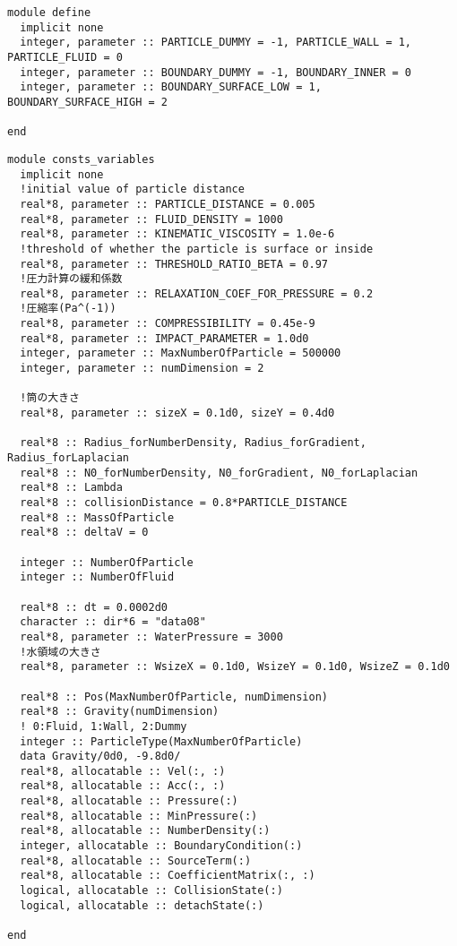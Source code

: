 \begin{lstlisting}[caption=定義値]
module define
  implicit none
  integer, parameter :: PARTICLE_DUMMY = -1, PARTICLE_WALL = 1, PARTICLE_FLUID = 0
  integer, parameter :: BOUNDARY_DUMMY = -1, BOUNDARY_INNER = 0
  integer, parameter :: BOUNDARY_SURFACE_LOW = 1, BOUNDARY_SURFACE_HIGH = 2

end
\end{lstlisting}
\begin{lstlisting}[caption=定数・変数の宣言]
  module consts_variables
  implicit none
  !initial value of particle distance
  real*8, parameter :: PARTICLE_DISTANCE = 0.005
  real*8, parameter :: FLUID_DENSITY = 1000
  real*8, parameter :: KINEMATIC_VISCOSITY = 1.0e-6
  !threshold of whether the particle is surface or inside
  real*8, parameter :: THRESHOLD_RATIO_BETA = 0.97
  !圧力計算の緩和係数
  real*8, parameter :: RELAXATION_COEF_FOR_PRESSURE = 0.2
  !圧縮率(Pa^(-1))
  real*8, parameter :: COMPRESSIBILITY = 0.45e-9
  real*8, parameter :: IMPACT_PARAMETER = 1.0d0
  integer, parameter :: MaxNumberOfParticle = 500000
  integer, parameter :: numDimension = 2

  !筒の大きさ
  real*8, parameter :: sizeX = 0.1d0, sizeY = 0.4d0
  
  real*8 :: Radius_forNumberDensity, Radius_forGradient, Radius_forLaplacian
  real*8 :: N0_forNumberDensity, N0_forGradient, N0_forLaplacian
  real*8 :: Lambda
  real*8 :: collisionDistance = 0.8*PARTICLE_DISTANCE
  real*8 :: MassOfParticle
  real*8 :: deltaV = 0
  
  integer :: NumberOfParticle
  integer :: NumberOfFluid
  
  real*8 :: dt = 0.0002d0
  character :: dir*6 = "data08"
  real*8, parameter :: WaterPressure = 3000
  !水領域の大きさ
  real*8, parameter :: WsizeX = 0.1d0, WsizeY = 0.1d0, WsizeZ = 0.1d0
  
  real*8 :: Pos(MaxNumberOfParticle, numDimension)
  real*8 :: Gravity(numDimension)
  ! 0:Fluid, 1:Wall, 2:Dummy
  integer :: ParticleType(MaxNumberOfParticle)
  data Gravity/0d0, -9.8d0/
  real*8, allocatable :: Vel(:, :)
  real*8, allocatable :: Acc(:, :)
  real*8, allocatable :: Pressure(:)
  real*8, allocatable :: MinPressure(:)
  real*8, allocatable :: NumberDensity(:)
  integer, allocatable :: BoundaryCondition(:)
  real*8, allocatable :: SourceTerm(:)
  real*8, allocatable :: CoefficientMatrix(:, :)
  logical, allocatable :: CollisionState(:)
  logical, allocatable :: detachState(:)

end

\end{lstlisting}